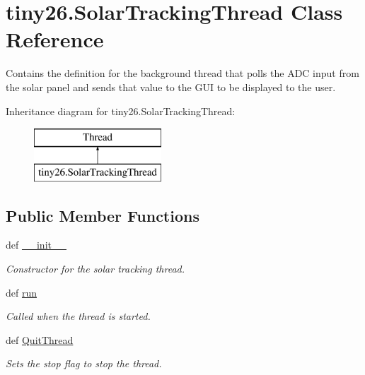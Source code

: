 \hypertarget{classtiny26_1_1_solar_tracking_thread}{\section{tiny26.\-Solar\-Tracking\-Thread Class Reference}
\label{classtiny26_1_1_solar_tracking_thread}
}


Contains the definition for the background thread that polls the A\-D\-C input from the solar panel and sends that value to the G\-U\-I to be displayed to the user.  


Inheritance diagram for tiny26.\-Solar\-Tracking\-Thread\-:\begin{figure}[H]
\begin{center}
\leavevmode
\includegraphics[height=2.000000cm]{classtiny26_1_1_solar_tracking_thread}
\end{center}
\end{figure}
\subsection*{Public Member Functions}
\begin{DoxyCompactItemize}
\item 
\hypertarget{classtiny26_1_1_solar_tracking_thread_a4c08b8abae1040b50dcd96f8f2386e40}{def \hyperlink{classtiny26_1_1_solar_tracking_thread_a4c08b8abae1040b50dcd96f8f2386e40}{\-\_\-\-\_\-init\-\_\-\-\_\-}}\label{classtiny26_1_1_solar_tracking_thread_a4c08b8abae1040b50dcd96f8f2386e40}

\begin{DoxyCompactList}\small\item\em Constructor for the solar tracking thread. \end{DoxyCompactList}\item 
def \hyperlink{classtiny26_1_1_solar_tracking_thread_a006529500ed94214eef1c856cc6cbc5b}{run}
\begin{DoxyCompactList}\small\item\em Called when the thread is started. \end{DoxyCompactList}\item 
def \hyperlink{classtiny26_1_1_solar_tracking_thread_a068e98629f1f0a139914e4d7a41d134b}{Quit\-Thread}
\begin{DoxyCompactList}\small\item\em Sets the stop flag to stop the thread. \end{DoxyCompactList}\end{DoxyCompactItemize}

